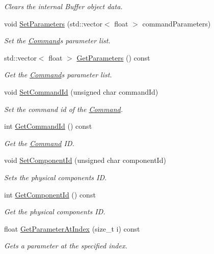 \begin{DoxyCompactItemize}
\begin{DoxyCompactList}\small\item\em Clears the internal Buffer object data. \end{DoxyCompactList}\item 
void \hyperlink{classrbp_1_1Command_adfa0956e61e8479efc702c177a610f19}{Set\+Parameters} (std\+::vector$<$ float $>$ command\+Parameters)
\begin{DoxyCompactList}\small\item\em Set the \hyperlink{classrbp_1_1Command}{Command}\textquotesingle{}s parameter list. \end{DoxyCompactList}\item 
std\+::vector$<$ float $>$ \hyperlink{classrbp_1_1Command_a80043c44270ebca1cf7e034679802199}{Get\+Parameters} () const 
\begin{DoxyCompactList}\small\item\em Get the \hyperlink{classrbp_1_1Command}{Command}\textquotesingle{}s parameter list. \end{DoxyCompactList}\item 
void \hyperlink{classrbp_1_1Command_af9c2d6072e683cfc39415d1d169cb7aa}{Set\+Command\+Id} (unsigned char command\+Id)
\begin{DoxyCompactList}\small\item\em Set the command id of the \hyperlink{classrbp_1_1Command}{Command}. \end{DoxyCompactList}\item 
int \hyperlink{classrbp_1_1Command_a624afad6a285be15cca2eaec837531a5}{Get\+Command\+Id} () const 
\begin{DoxyCompactList}\small\item\em Get the \hyperlink{classrbp_1_1Command}{Command} I\+D. \end{DoxyCompactList}\item 
void \hyperlink{classrbp_1_1Command_a75abecaa8268985abd4abfc3196eb792}{Set\+Component\+Id} (unsigned char component\+Id)
\begin{DoxyCompactList}\small\item\em Sets the physical component\textquotesingle{}s I\+D. \end{DoxyCompactList}\item 
int \hyperlink{classrbp_1_1Command_ab02c129eb464b07ec2da3314220805ad}{Get\+Component\+Id} () const 
\begin{DoxyCompactList}\small\item\em Get the physical component\textquotesingle{}s I\+D. \end{DoxyCompactList}\item 
float \hyperlink{classrbp_1_1Command_af73fe264ef6130b40993851f6e39def0}{Get\+Parameter\+At\+Index} (size\+\_\+t i) const 
\begin{DoxyCompactList}\small\item\em Gets a parameter at the specified index. \end{DoxyCompactList}\end{DoxyCompactItemize}


